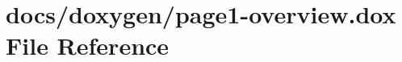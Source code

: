 \hypertarget{page1-overview_8dox}{\section{docs/doxygen/page1-\/overview.dox File Reference}
\label{page1-overview_8dox}
}
